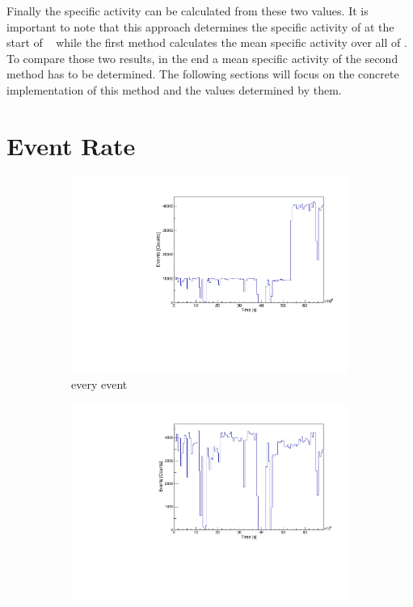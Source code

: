 \documentclass[encoding=utf8,british]{tumphthesis}
\begin{document}
Finally the specific activity can be calculated from these two values.
It is important to note that this approach determines the specific activity of \Kr at the start of \PII~ while the first method calculates the mean specific activity over all of \PII.
To compare those two results, in the end a mean specific activity of the second method has to be determined.
The following sections will focus on the concrete implementation of this method and the values determined by them.
\\

\section{Event Rate}
\label{sec:EventAct}

\begin{figure}[t!]
	\centering
	\begin{subfigure}{.5\textwidth}
		\centering
		\includegraphics[width=\textwidth]{./Bilder/ZeitverlaufALLE.pdf}
		\caption{every event}
		\label{fig:ZeitAll}
	\end{subfigure}%
	\begin{subfigure}{.5\textwidth}
		\centering
		\includegraphics[width=\textwidth]{./Bilder/ZeitverlaufLimits.pdf}

\end{subfigure}
\end{figure}
\end{document}
